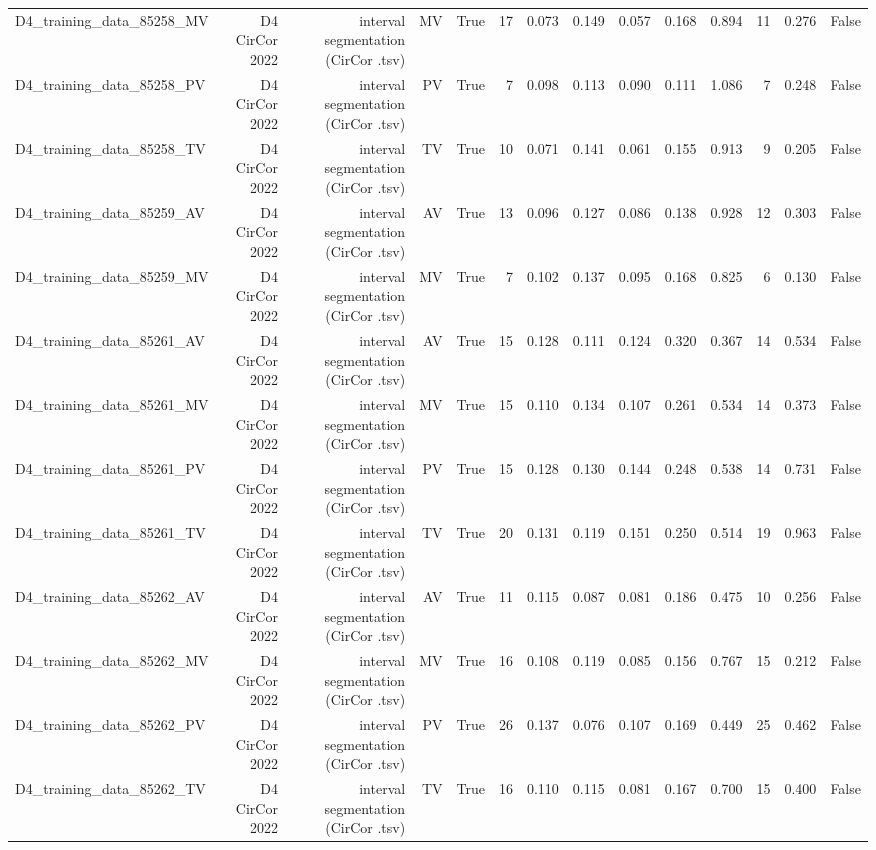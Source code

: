 \begin{table}[htbp]
\begin{tabular}{lrrrrrrrrrrrrr}
    D4\_training\_data\_85258\_MV & D4 CirCor 2022 & interval segmentation (CirCor .tsv) & MV & True & 17 & 0.073 & 0.149 & 0.057 & 0.168 & 0.894 & 11 & 0.276 & False \\
    D4\_training\_data\_85258\_PV & D4 CirCor 2022 & interval segmentation (CirCor .tsv) & PV & True & 7 & 0.098 & 0.113 & 0.090 & 0.111 & 1.086 & 7 & 0.248 & False \\
    D4\_training\_data\_85258\_TV & D4 CirCor 2022 & interval segmentation (CirCor .tsv) & TV & True & 10 & 0.071 & 0.141 & 0.061 & 0.155 & 0.913 & 9 & 0.205 & False \\
    D4\_training\_data\_85259\_AV & D4 CirCor 2022 & interval segmentation (CirCor .tsv) & AV & True & 13 & 0.096 & 0.127 & 0.086 & 0.138 & 0.928 & 12 & 0.303 & False \\
    D4\_training\_data\_85259\_MV & D4 CirCor 2022 & interval segmentation (CirCor .tsv) & MV & True & 7 & 0.102 & 0.137 & 0.095 & 0.168 & 0.825 & 6 & 0.130 & False \\
    D4\_training\_data\_85261\_AV & D4 CirCor 2022 & interval segmentation (CirCor .tsv) & AV & True & 15 & 0.128 & 0.111 & 0.124 & 0.320 & 0.367 & 14 & 0.534 & False \\
    D4\_training\_data\_85261\_MV & D4 CirCor 2022 & interval segmentation (CirCor .tsv) & MV & True & 15 & 0.110 & 0.134 & 0.107 & 0.261 & 0.534 & 14 & 0.373 & False \\
    D4\_training\_data\_85261\_PV & D4 CirCor 2022 & interval segmentation (CirCor .tsv) & PV & True & 15 & 0.128 & 0.130 & 0.144 & 0.248 & 0.538 & 14 & 0.731 & False \\
    D4\_training\_data\_85261\_TV & D4 CirCor 2022 & interval segmentation (CirCor .tsv) & TV & True & 20 & 0.131 & 0.119 & 0.151 & 0.250 & 0.514 & 19 & 0.963 & False \\
    D4\_training\_data\_85262\_AV & D4 CirCor 2022 & interval segmentation (CirCor .tsv) & AV & True & 11 & 0.115 & 0.087 & 0.081 & 0.186 & 0.475 & 10 & 0.256 & False \\
    D4\_training\_data\_85262\_MV & D4 CirCor 2022 & interval segmentation (CirCor .tsv) & MV & True & 16 & 0.108 & 0.119 & 0.085 & 0.156 & 0.767 & 15 & 0.212 & False \\
    D4\_training\_data\_85262\_PV & D4 CirCor 2022 & interval segmentation (CirCor .tsv) & PV & True & 26 & 0.137 & 0.076 & 0.107 & 0.169 & 0.449 & 25 & 0.462 & False \\
    D4\_training\_data\_85262\_TV & D4 CirCor 2022 & interval segmentation (CirCor .tsv) & TV & True & 16 & 0.110 & 0.115 & 0.081 & 0.167 & 0.700 & 15 & 0.400 & False \\

\end{tabular}
\end{table}

